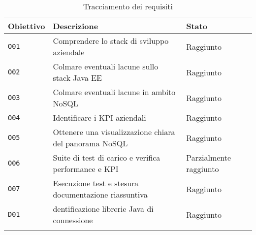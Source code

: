 \begin{table}
\begin{center}
    
    \renewcommand{\arraystretch}{1.5}
    
    \centering
    \begin{longtable}{| C{2cm} | C{7cm} | C{3.5cm} |}
        
        \hline
        
        \textbf{Obiettivo} & \textbf{Descrizione} & \textbf{Stato} \\
        
        \hline
        
        \texttt{O01} & Comprendere lo stack di sviluppo aziendale & Raggiunto \\
        
        \hline 
        
        \texttt{O02} & Colmare eventuali lacune sullo stack Java EE & Raggiunto \\
        
        \hline 
        
        \texttt{O03} & Colmare eventuali lacune in ambito NoSQL & Raggiunto \\
        
        \hline 
        
        \texttt{O04} & Identificare i KPI aziendali & Raggiunto \\
        
        \hline
        
        \texttt{O05} & Ottenere una visualizzazione chiara del panorama NoSQL & Raggiunto  \\
        
        \hline 
        
        \texttt{O06} & Suite di test di carico e verifica performance e KPI & Parzialmente raggiunto \\
        
        \hline 
        
        \texttt{O07} & Esecuzione test e stesura documentazione riassuntiva & Raggiunto  \\
        
        \hline 
        
        \texttt{D01} & dentificazione librerie Java di connessione & Raggiunto  \\
        
        \hline 
        
        \caption{Tracciamento dei requisiti}\label{tab:tracciamento}
    \end{longtable}
    
    
\end{center}
\end{table}

